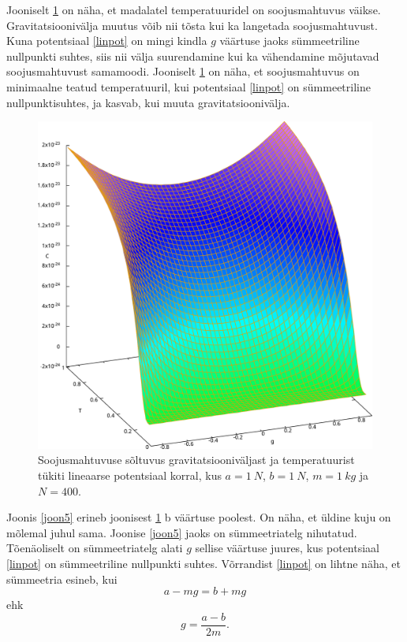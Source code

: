 \documentclass{trkut}%
\begin{document}
Jooniselt \ref{joon1} on näha, et madalatel temperatuuridel on soojusmahtuvus väikse.
Gravitatsioonivälja muutus võib nii tõsta kui ka langetada soojusmahtuvust.
Kuna potentsiaal \eqref{linpot} on mingi kindla $g$ väärtuse jaoks sümmeetriline nullpunkti suhtes, siis nii välja suurendamine kui ka vähendamine mõjutavad soojusmahtuvust samamoodi.
Jooniselt \ref{joon1} on näha, et soojusmahtuvus on minimaalne teatud temperatuuril, kui potentsiaal \eqref{linpot} on sümmeetriline nullpunktisuhtes, ja kasvab, kui muuta gravitatsioonivälja.

\begin{figure}[htb!]
    \includegraphics[width=\textwidth]{maxima/m1a1b1T0_1S400_2.pdf}
    \caption{Soojusmahtuvuse sõltuvus gravitatsiooniväljast ja temperatuurist tükiti lineaarse potentsiaal korral, kus $a=\SI{1}{N}$, $b=\SI{1}{N}$, $m=\SI{1}{kg}$ ja $N=400$.}
    \label{joon1}
\end{figure}

Joonis \ref{joon5} erineb joonisest \ref{joon1} b väärtuse poolest.
On näha, et üldine kuju on mõlemal juhul sama.
Joonise \ref{joon5} jaoks on sümmeetriatelg nihutatud.
Tõenäoliselt on sümmeetriatelg alati $g$ sellise väärtuse juures, kus potentsiaal \eqref{linpot} on sümmeetriline nullpunkti suhtes.
Võrrandist \eqref{linpot} on lihtne näha, et sümmeetria esineb, kui
\begin{equation}
    a-mg=b+mg
\end{equation}
ehk
\begin{equation}
    g=\frac{a-b}{2m}.
\end{equation}
\end{document}
